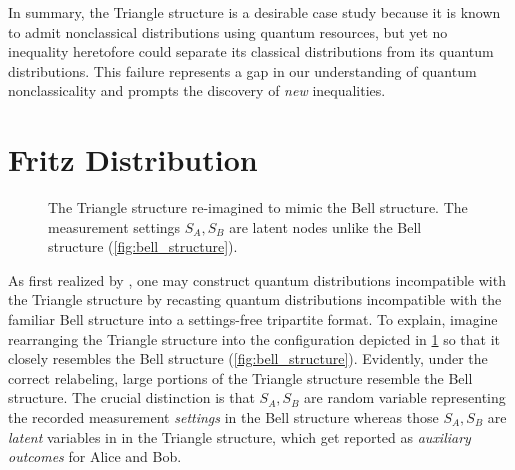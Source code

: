 \documentclass[aps, 10pt, english, twoside, pra, nofootinbib, tightenlines, longbibliography, superscriptaddress]{revtex4-1}
\begin{document}
    In summary, the Triangle structure is a desirable case study because it is known to admit nonclassical distributions using quantum resources, but yet no inequality heretofore could separate its classical distributions from its quantum distributions. This failure represents a gap in our understanding of quantum nonclassicality and prompts the discovery of \textit{new} inequalities.

    \section{Fritz Distribution}
    \label{sec:fritz_distribution}
    \begin{figure}
    \begin{nscenter}
        \caption{The Triangle structure re-imagined to mimic the Bell structure. The measurement settings $S_{A},S_{B}$ are latent nodes unlike the Bell structure (\cref{fig:bell_structure}).}
        \label{fig:triangle_structure_with_fritz_bell_embedded}
    \end{nscenter}
    \end{figure}

    As first realized by \citet{Fritz_2012}, one may construct quantum distributions incompatible with the Triangle structure by recasting quantum distributions incompatible with the familiar Bell structure into a settings-free tripartite format. To explain, imagine rearranging the Triangle structure into the configuration depicted in \cref{fig:triangle_structure_with_fritz_bell_embedded} so that it closely resembles the Bell structure (\cref{fig:bell_structure}). Evidently, under the correct relabeling, large portions of the Triangle structure resemble the Bell structure. The crucial distinction is that $S_{A}, S_{B}$ are random variable representing the recorded measurement \emph{settings} in the Bell structure whereas those $S_{A}, S_{B}$ are \emph{latent} variables in in the Triangle structure, which get reported as \textit{auxiliary outcomes} for Alice and Bob.
\end{document}

